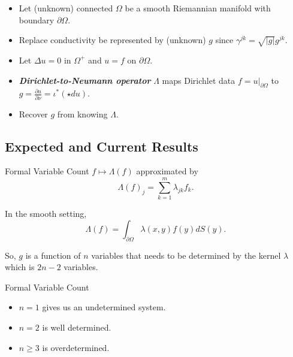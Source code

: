 \documentclass[aspectratio=169]{beamer}
\newcommand\boldgreen[1]{\textcolor{lighter_csu_green}{\emph{\textbf{#1}}}}
\begin{document}
\begin{frame}{}
\vfill 
    \begin{itemize}
        \pause
        \item Let (unknown) connected $\Omega$ be a smooth Riemannian manifold with boundary $\partial \Omega$.
        
        \pause
        \item Replace conductivity be represented by (unknown) $g$ since $\gamma^{jk}=\sqrt{|g|}g^{jk}$.
        
        \pause
        \item Let $\Delta u = 0$ in $\Omega^+$ and $u=f$ on $\partial \Omega$.
        
        \pause
        \item \boldgreen{Dirichlet-to-Neumann operator} $\Lambda$ maps Dirichlet data $f=u|_{\partial \Omega}$ to $g = \frac{\partial u}{\partial \nu}=\iota^*(\star d u)$.
        
        \pause
        \item Recover $g$ from knowing $\Lambda$.
    
    \end{itemize}
\end{frame}

\subsection{Expected and Current Results}

\begin{frame}{Formal Variable Count}
    \pause $f \mapsto \Lambda(f)$ approximated by
    \[
    \Lambda(f)_j = \sum_{k=1}^m \lambda_{jk} f_k.
    \]
    
    \pause In the smooth setting,
    \[
    \Lambda(f) = \int_{\partial \Omega} \lambda(x,y) f(y)dS(y).
    \]
    
    \pause So, $g$ is a function of $n$ variables that needs to be determined by the kernel $\lambda$ which is $2n-2$ variables.
\end{frame}

\begin{frame}{Formal Variable Count}
\vfill
\begin{itemize}
    \pause 
    \item $n=1$ gives us an undetermined system.
    
    \pause
    \item $n=2$ is well determined.
    
    \pause
    \item $n\geq 3$ is overdetermined.
   \end{itemize}
\vfill   
\end{frame}
\end{document}
